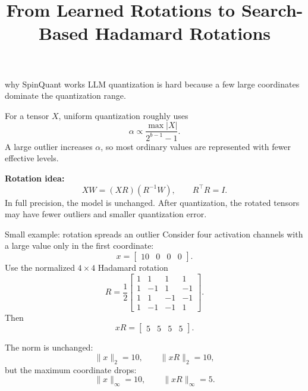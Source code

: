 \documentclass[aspectratio=169,11pt]{beamer}
\title{From Learned Rotations to Search-Based Hadamard Rotations}
\author{}
\date{}
\newcommand{\R}{\mathbb{R}}
\begin{document}
\begin{frame}
  \titlepage
\end{frame}

\begin{frame}{why SpinQuant works}
\vspace{0.2cm}
LLM quantization is hard because a few large coordinates dominate the quantization range.

\vspace{0.3cm}
For a tensor $X$, uniform quantization roughly uses
\[
\alpha \propto \frac{\max |X|}{2^{b-1}-1}.
\]
A large outlier increases $\alpha$, so most ordinary values are represented with fewer effective levels.

\vspace{0.4cm}
\textbf{Rotation idea:}
\[
XW = (XR)(R^{-1}W), \qquad R^\top R = I.
\]
In full precision, the model is unchanged. After quantization, the rotated tensors may have fewer outliers and smaller quantization error.
\end{frame}

\begin{frame}{Small example: rotation spreads an outlier}
Consider four activation channels with a large value only in the first coordinate:
\[
 x = \begin{bmatrix} 10 & 0 & 0 & 0 \end{bmatrix}.
\]
Use the normalized $4\times 4$ Hadamard rotation
\[
R = \frac{1}{2}
\begin{bmatrix}
1&1&1&1\\
1&-1&1&-1\\
1&1&-1&-1\\
1&-1&-1&1
\end{bmatrix}.
\]
Then
\[
 xR = \begin{bmatrix}5&5&5&5\end{bmatrix}.
\]

\vspace{0.2cm}
The norm is unchanged:
\[
\|x\|_2 = 10, \qquad \|xR\|_2 = 10,
\]
but the maximum coordinate drops:
\[
\|x\|_\infty = 10, \qquad \|xR\|_\infty = 5.
\]
\end{frame}


\end{document}

